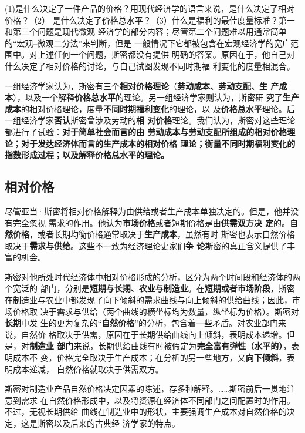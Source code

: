 (1)是什么决定了一件产品的价格？用现代经济学的语言来说，是什么决定了相对价格？（2）
是什么决定了价格总水平？（3）什么是福利的最佳度量标准？第一和第三个问题是现代微观
经济学的部分内容；尽管第二个问题难以用通常简单的“宏观--微观二分法”来判断，但是
一般情况下它都被包含在宏观经济学的宽广范围中。对上述任何一个问题，斯密都没有提供
明确的答案。原因在于，他自己对什么决定了相对价格的讨论，与自己试图发现不同时期福
利变化的度量相混合。

一组经济学家认为，斯密有三个\textbf{相对价格理论}（\textbf{劳动成本、劳动支配、生
  产成本}），以及一个解释\textbf{价格总水平}的理论。另一组经济学家则认为，斯密研
究了\textbf{生产成本}的相对价格理论，度量\textbf{不同时期福利变化}的理论，以
及\textbf{价格总水平}理论。后一组经济学家\textbf{否认}斯密曾涉及劳动的\textbf{相
  对价格}理论。我们认为，斯密对这些理论都进行了试验：\textbf{对于简单社会而言的由
  劳动成本与劳动支配所组成的相对价格理论；对于发达经济体而言的生产成本的相对价格
  理论；衡量不同时期福利变化的指数形成过程；以及解释价格总水平的理论。}

\subsection{相对价格}

尽管亚当·斯密将相对价格解释为由供给或者生产成本单独决定的。但是，他并没有完全忽视
需求的作用。他认为\textbf{市场价格}或者短期价格是由\textbf{供需双方决
  定}的。\textbf{自然价格}，或者长期均衡价格通常取决于\textbf{生产成本}，虽然有时
斯密也表示自然价格取决于\textbf{需求与供给}。这些不一致为经济理论史家们\textbf{争
  论}斯密的真正含义提供了丰富的机会。

斯密对他所处时代经济体中相对价格形成的分析，区分为两个时间段和经济体的两个宽泛的
部门，分别是\textbf{短期与长期、农业与制造业}。在\textbf{短期或者市场阶段}，斯密
在制造业与农业中都发现了向下倾斜的需求曲线与向上倾斜的供给曲线；因此，市场价格取
决于需求与供给（两个曲线的横坐标均为数量，纵坐标为价格）。斯密对\textbf{长期}中发
生的更为复杂的“\textbf{自然价格}”的分析，包含着一些矛盾。对农业部门来说，自然价
格取决于供需，原因在于长期供给曲线向上倾斜，表明成本递增。但是，对\textbf{制造业
  部门}来说，长期供给曲线有时被假定为\textbf{完全富有弹性（水平的）}，表明成本不
变，价格完全取决于生产成本；在分析的另一些地方，又\textbf{向下倾斜}，表明成本递减，
自然价格就取决于供需双方。

斯密对制造业产品自然价格决定因素的陈述，存多种解释。……斯密前后一贯地注意到需求
在自然价格形成中，以及将资源在经济体不同部门之间配置时的作用。不过，无视长期供给
曲线在制造业中的形状，主要强调生产成本对自然价格的决定，这是斯密以及后来的古典经
济学家的特点。


